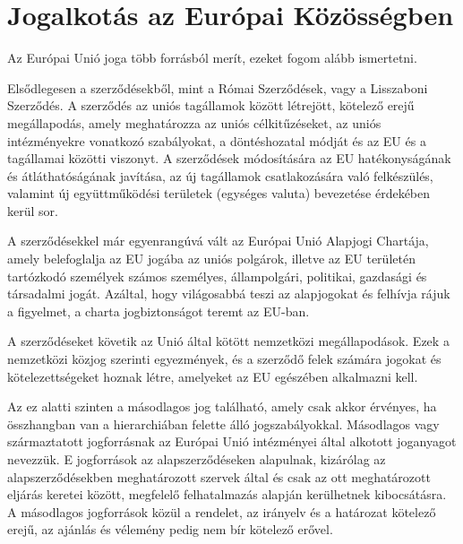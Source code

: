 \section{Jogalkotás az Európai Közösségben}

Az Európai Unió joga több forrásból merít, ezeket fogom alább ismertetni. \cite{EU-jog}

Elsődlegesen a szerződésekből, mint a Római Szerződések, vagy a Lisszaboni Szerződés. A szerződés az uniós tagállamok között létrejött, kötelező erejű megállapodás, amely meghatározza az uniós célkitűzéseket, az uniós intézményekre vonatkozó szabályokat, a döntéshozatal módját és az EU és a tagállamai közötti viszonyt. A szerződések módosítására az EU hatékonyságának és átláthatóságának javítása, az új tagállamok csatlakozására való felkészülés, valamint új együttműködési területek (egységes valuta) bevezetése érdekében kerül sor. \cite{EU-szerzodesek}

A szerződésekkel már egyenrangúvá vált az Európai Unió Alapjogi Chartája, amely belefoglalja az EU jogába az uniós polgárok, illetve az EU területén tartózkodó személyek számos személyes, állampolgári, politikai, gazdasági és társadalmi jogát. Azáltal, hogy világosabbá teszi az alapjogokat és felhívja rájuk a figyelmet, a charta jogbiztonságot teremt az EU-ban. \cite{EU-charta}

A szerződéseket követik az Unió által kötött nemzetközi megállapodások. Ezek a nemzetközi közjog szerinti egyezmények, és a szerződő felek számára jogokat és kötelezettségeket hoznak létre, amelyeket az EU egészében alkalmazni kell. \cite{EU-nemzetkozi}

Az ez alatti szinten a másodlagos jog található, amely csak akkor érvényes, ha összhangban van a hierarchiában felette álló jogszabályokkal. Másodlagos vagy származtatott jogforrásnak az Európai Unió intézményei által alkotott joganyagot nevezzük. E jogforrások az alapszerződéseken alapulnak, kizárólag az alapszerződésekben meghatározott szervek által és csak az ott meghatározott eljárás keretei között, megfelelő felhatalmazás alapján kerülhetnek kibocsátásra. A másodlagos jogforrások közül a rendelet, az irányelv és a határozat kötelező erejű, az ajánlás és vélemény pedig nem bír kötelező erővel. \cite{EU-masodlagos}